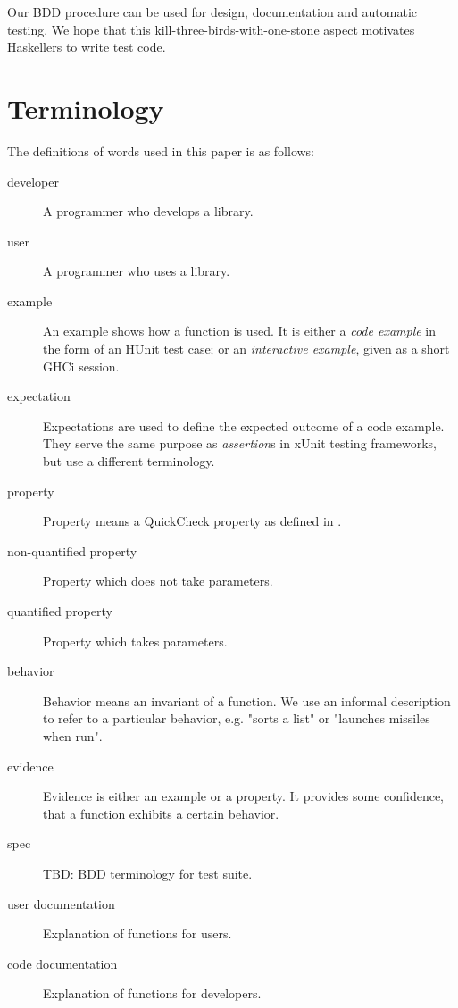 \documentclass[preprint]{sigplanconf}
\begin{document}
\noindent Our BDD procedure
can be used for design, documentation and automatic testing.
We hope that this kill-three-birds-with-one-stone aspect
motivates Haskellers to write test code.

\section{Terminology}

The definitions of words used in this paper is as follows:

\begin{description}

\item[developer]
    A programmer who develops a library.

\item[user]
    A programmer who uses a library.

\item[example]
    An example shows how a function is used.  It is either a \emph{code
    example} in the form of an HUnit test case; or an \emph{interactive
    example}, given as a short GHCi session.

\item[expectation]
    Expectations are used to define the expected outcome of a code
    example.  They serve the same purpose as \emph{assertion}\/s in xUnit
    testing frameworks, but use a different terminology.

\item[property]
    Property means a QuickCheck property as defined in
    \cite{quickcheck}.

\item[non-quantified property]
    Property which does not take parameters.

\item[quantified property]
    Property which takes parameters.

\item[behavior]
    Behavior means an invariant of a function.  We use an informal description
    to refer to a particular behavior, e.g.  "sorts a list" or "launches
    missiles when run".

\item[evidence]
    Evidence is either an example or a property.  It provides some confidence,
    that a function exhibits a certain behavior.

\item[spec]
    TBD: BDD terminology for test suite.

\item[user documentation]
    Explanation of functions for users.
\item[code documentation]
    Explanation of functions for developers.

\end{description}
\end{document}
